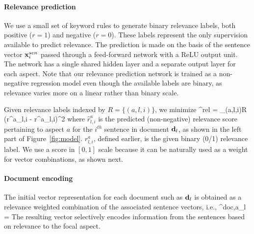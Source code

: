 \paragraph{Relevance prediction} 
We use a small set of keyword rules to generate binary relevance labels, both positive ($r=1$) and negative ($r=0$). These labels represent the only supervision available to predict relevance. The prediction is made on the basis of the sentence vector $\mathbf{x}^{sen}_i$ passed through a feed-forward network with a ReLU output unit. The network has a single shared hidden layer and a separate output layer for each aspect. Note that our relevance prediction network is trained as a non-negative regression model even though the available labels are binary, as relevance varies more on a linear rather than binary scale.

Given relevance labels indexed by $R=\{(a,l,i)\}$, we minimize 
\be
{}^{rel} = \sum_{(a,l,i)\in R} \big(r^a_{l,i} - \hat r^a_{l,i}\big)^2
\ee
where $\hat r^a_{l,i}$ is the predicted (non-negative) relevance score pertaining to aspect $a$ for the $i^{th}$ sentence in document $\mathbf{d}_l$, as shown in the left part of Figure~\ref{fig:model}. $r^a_{l,i}$, defined earlier, is the given binary (0/1) relevance label. 
We use a score in $[0, 1]$ scale because it can be naturally used as a weight for vector combinations, as shown next.

\paragraph{Document encoding}

The initial vector representation for each document such as $\mathbf{d}_l$ is obtained as a relevance weighted combination of the associated sentence vectors, i.e.,
\be
{}^{doc,a}_l = 
\ee
The resulting vector selectively encodes information from the sentences based on relevance to the focal aspect.

